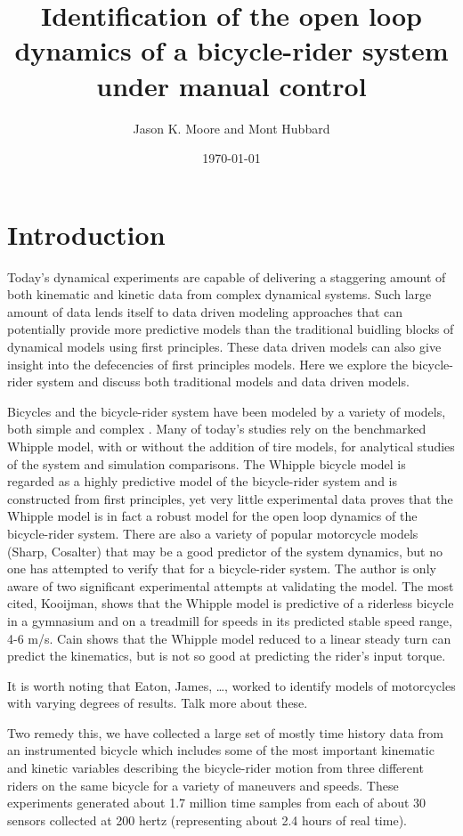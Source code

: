 \documentclass[a4paper]{article}
\title{Identification of the open loop dynamics of a bicycle-rider system
under manual control}
\author{Jason K. Moore and Mont Hubbard}
\date{\today}
\begin{document}
\maketitle

\section{Introduction}

Today's dynamical experiments are capable of delivering a staggering amount of both kinematic and
kinetic data from complex dynamical systems. Such large amount of data lends
itself to data driven modeling approaches that can potentially provide more
predictive models than the traditional buidling blocks of dynamical models using first principles.
These data driven models can also give insight into the defecencies of first
principles models. Here we explore the bicycle-rider system and discuss both
traditional models and data driven models.

Bicycles and the bicycle-rider system have been modeled by a variety of models,
both simple \cite{Timoshenko1948} and complex \cite{Sharp1971}. Many of
today's studies rely on the benchmarked Whipple model, with or without the
addition of tire models, for analytical studies of the system and simulation
comparisons. The Whipple bicycle model is regarded as a highly predictive model
of the bicycle-rider system and is constructed from first principles, yet very
little experimental data proves that the Whipple model is in fact a robust
model for the open loop dynamics of the bicycle-rider system. There are also a
variety of popular motorcycle models (Sharp, Cosalter) that may be a good
predictor of the system dynamics, but no one has attempted to verify that for a
bicycle-rider system. The author is only aware of two significant experimental
attempts at validating the model. The most cited, Kooijman, shows that the
Whipple model is predictive of a riderless bicycle in a gymnasium and on
a treadmill for speeds in its predicted stable speed range, 4-6 m/s. Cain shows
that the Whipple model reduced to a linear steady turn can predict the
kinematics, but is not so good at predicting the rider's input torque.

It is worth noting that Eaton, James, \ldots, worked to identify models of
motorcycles with varying degrees of results. Talk more about these. %

Two remedy this,%
we have collected a large set of mostly time history data from
an instrumented bicycle which includes some of the most important kinematic and
kinetic variables describing the bicycle-rider motion from three different
riders on the same bicycle for a variety of maneuvers and speeds. %
These experiments generated about 1.7 million time samples from each of about 30
sensors collected at 200 hertz (representing about 2.4 hours of real time).
\end{document}
